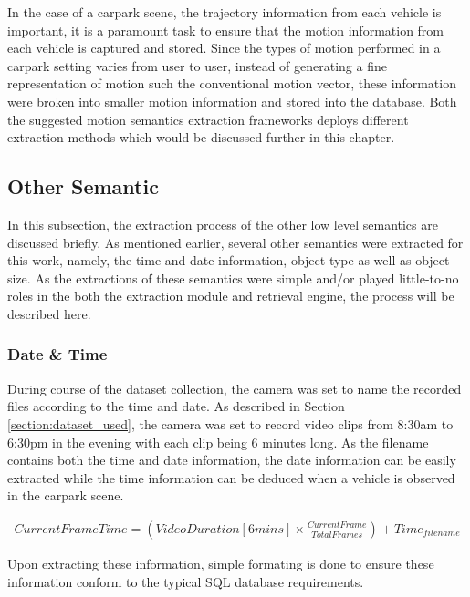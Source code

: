 In the case of a carpark scene, the trajectory information from each vehicle is important, it is a paramount task to ensure that the motion information from each vehicle is captured and stored. Since the types of motion performed in a carpark setting varies from user to user, instead of generating a fine representation of motion such the conventional motion vector, these information were broken into smaller motion information and stored into the database. Both the suggested motion semantics extraction frameworks deploys different extraction methods which would be discussed further in this chapter.






\subsection{Other Semantic}

In this subsection, the extraction process of the other low level semantics are discussed briefly. As mentioned earlier, several other semantics were extracted for this work, namely, the time and date information, object type as well as object size. As the extractions of these semantics were simple and/or played little-to-no roles in the both the extraction module and retrieval engine, the process will be described here.

\subsubsection{Date \& Time}
During course of the dataset collection, the camera was set to name the recorded files according to the time and date. As described in Section \ref{section:dataset_used}, the camera was set to record video clips from 8:30am to 6:30pm in the evening with each clip being 6 minutes long. As the filename contains both the time and date information, the date information can be easily extracted while the time information can be deduced when a vehicle is observed in the carpark scene. 

\begin{align}
	Current Frame Time = (Video Duration [6 mins] \times \frac{Current Frame}{Total Frames}) + Time_{filename} 
\end{align}


Upon extracting these information, simple formating is done to ensure these information conform to the typical SQL database requirements.

